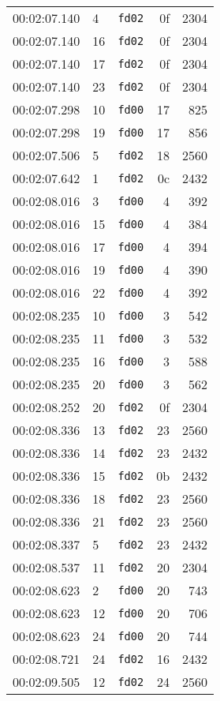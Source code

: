 \documentclass{article}
\begin{document}
\begin{longtable}{lllrr}
00:02:07.140 & 4 & \texttt{fd02} & 0f & 2304 \\
00:02:07.140 & 16 & \texttt{fd02} & 0f & 2304 \\
00:02:07.140 & 17 & \texttt{fd02} & 0f & 2304 \\
00:02:07.140 & 23 & \texttt{fd02} & 0f & 2304 \\
00:02:07.298 & 10 & \texttt{fd00} & 17 & 825 \\
00:02:07.298 & 19 & \texttt{fd00} & 17 & 856 \\
00:02:07.506 & 5 & \texttt{fd02} & 18 & 2560 \\
00:02:07.642 & 1 & \texttt{fd02} & 0c & 2432 \\
00:02:08.016 & 3 & \texttt{fd00} & 4 & 392 \\
00:02:08.016 & 15 & \texttt{fd00} & 4 & 384 \\
00:02:08.016 & 17 & \texttt{fd00} & 4 & 394 \\
00:02:08.016 & 19 & \texttt{fd00} & 4 & 390 \\
00:02:08.016 & 22 & \texttt{fd00} & 4 & 392 \\
00:02:08.235 & 10 & \texttt{fd00} & 3 & 542 \\
00:02:08.235 & 11 & \texttt{fd00} & 3 & 532 \\
00:02:08.235 & 16 & \texttt{fd00} & 3 & 588 \\
00:02:08.235 & 20 & \texttt{fd00} & 3 & 562 \\
00:02:08.252 & 20 & \texttt{fd02} & 0f & 2304 \\
00:02:08.336 & 13 & \texttt{fd02} & 23 & 2560 \\
00:02:08.336 & 14 & \texttt{fd02} & 23 & 2432 \\
00:02:08.336 & 15 & \texttt{fd02} & 0b & 2432 \\
00:02:08.336 & 18 & \texttt{fd02} & 23 & 2560 \\
00:02:08.336 & 21 & \texttt{fd02} & 23 & 2560 \\
00:02:08.337 & 5 & \texttt{fd02} & 23 & 2432 \\
00:02:08.537 & 11 & \texttt{fd02} & 20 & 2304 \\
00:02:08.623 & 2 & \texttt{fd00} & 20 & 743 \\
00:02:08.623 & 12 & \texttt{fd00} & 20 & 706 \\
00:02:08.623 & 24 & \texttt{fd00} & 20 & 744 \\
00:02:08.721 & 24 & \texttt{fd02} & 16 & 2432 \\
00:02:09.505 & 12 & \texttt{fd02} & 24 & 2560 \\

\end{longtable}
\end{document}
